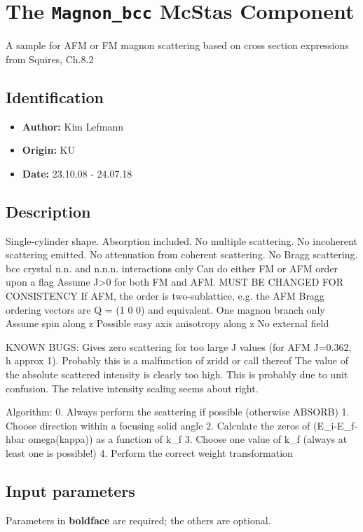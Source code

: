 \section{The \texttt{Magnon\_bcc} McStas Component}
A sample for AFM or FM magnon scattering
based on cross section expressions from Squires, Ch.8.2

\subsection*{Identification}
\begin{itemize}
  \item \textbf{Author:} Kim Lefmann
  \item \textbf{Origin:} KU
  \item \textbf{Date:} 23.10.08 - 24.07.18
\end{itemize}

\subsection*{Description}
Single-cylinder shape. Absorption included. No multiple scattering. No incoherent scattering emitted. No attenuation from coherent scattering. No Bragg scattering. bcc crystal n.n. and n.n.n. interactions only Can do either FM or AFM order upon a flag Assume J\textgreater{}0 for both FM and AFM. MUST BE CHANGED FOR CONSISTENCY If AFM, the order is two-sublattice, e.g. the AFM Bragg ordering vectors are Q = (1 0 0) and equivalent. One magnon branch only Assume spin along z Possible easy axis anisotropy along z No external field

KNOWN BUGS: Gives zero scattering for too large J values (for AFM J=0.362, h approx 1). Probably this is a malfunction of zridd or call thereof The value of the absolute scattered intensity is clearly too high. This is probably due to unit confusion. The relative intensity scaling seems about right.

Algorithm: 0. Always perform the scattering if possible (otherwise ABSORB) 1. Choose direction within a focusing solid angle 2. Calculate the zeros of (E\_i-E\_f-hbar omega(kappa)) as a function of k\_f 3. Choose one value of k\_f (always at least one is possible!) 4. Perform the correct weight transformation

\subsection*{Input parameters}
Parameters in \textbf{boldface} are required; the others are optional.

